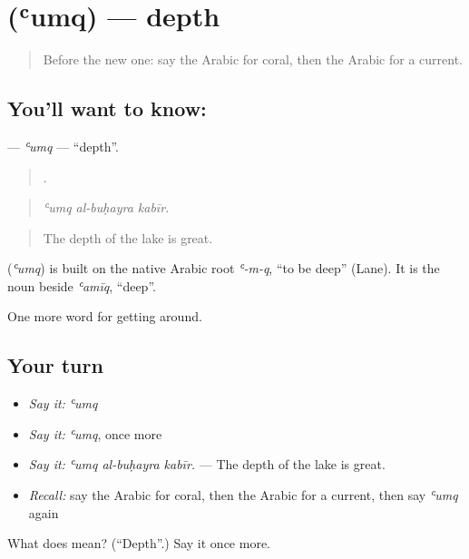 \section[\texorpdfstring{\ar{عمق} (ʿumq)}{عمق (ʿumq)}]{ (ʿumq) — depth}

\label{lesson:AR-C471-umq}



\begin{quote}
Before the new one: say the Arabic for coral, then the Arabic for a current.
\end{quote}

\subsection*{You'll want to know: }
\textbf{} — \emph{ʿumq} — \textquotedblleft{}depth\textquotedblright{}.

\begin{quote}
  .
\end{quote}

\begin{quote}
\emph{ʿumq al-buḥayra kabīr.}
\end{quote}

\begin{quote}
The depth of the lake is great.
\end{quote}

\begin{cousinweb}
\textbf{} (\emph{ʿumq}) is built on the native Arabic root \emph{ʿ-m-q}, \textquotedblleft{}to be deep\textquotedblright{} (Lane). It is the noun beside \emph{ʿamīq}, \textquotedblleft{}deep\textquotedblright{}.
\end{cousinweb}

\begin{grammarlens}[title={What you've built}]
One more word for getting around.
\end{grammarlens}

\subsection*{Your turn}
\begin{itemize}
\raggedright
  \item \emph{Say it:} \emph{ʿumq}
  \item \emph{Say it:} \emph{ʿumq}, once more
  \item \emph{Say it:} \emph{ʿumq al-buḥayra kabīr.} — The depth of the lake is great.
  \item \emph{Recall:} say the Arabic for coral, then the Arabic for a current, then say \emph{ʿumq} again
\end{itemize}

\begin{tcolorbox}[breakable,colback=teal!4,colframe=teal!35!black,title={Before you move on}]
What does  mean? (\textquotedblleft{}Depth\textquotedblright{}.) Say it once more.
\end{tcolorbox}
